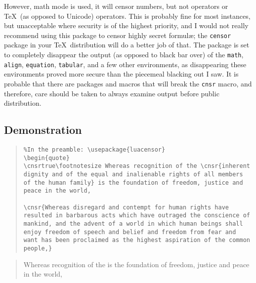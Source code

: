 \documentclass{article}
\begin{document}
 However, math mode is used, it will censor numbers, but not operators or \TeX\ (as opposed to Unicode) operators.  This is probably fine for most instances, but unacceptable where security is of the highest priority, and I would not really recommend using this package to censor highly secret formulæ; the \texttt{censor} package in your \TeX\ distribution will do a better job of that.  The package is set to completely disappear the output (as opposed to black bar over) of the \texttt{math}, \texttt{align}, \texttt{equation}, \texttt{tabular}, and a few other environments, as disappearing these environments proved more secure than the piecemeal blacking out I saw.  It is probable that there are packages and macros that will break the \texttt{cnsr} macro, and therefore, care should be taken to always examine output before public distribution.
 \subsection{Demonstration}
 \begin{quote}
 \begin{verbatim}
%In the preamble: \usepackage{luacensor}
\begin{quote}
\cnsrtrue\footnotesize Whereas recognition of the \cnsr{inherent dignity and of the equal and inalienable rights of all members of the human family} is the foundation of freedom, justice and peace in the world,

\cnsr{Whereas disregard and contempt for human rights have resulted in barbarous acts which have outraged the conscience of mankind, and the advent of a world in which human beings shall enjoy freedom of speech and belief and freedom from fear and want has been proclaimed as the highest aspiration of the common people,}
 \end{verbatim}
 \end{quote}
 \begin{quote}
\cnsrtrue\footnotesize Whereas recognition of the  is the foundation of freedom, justice and peace in the world,


 \end{quote}
 
\end{document}
